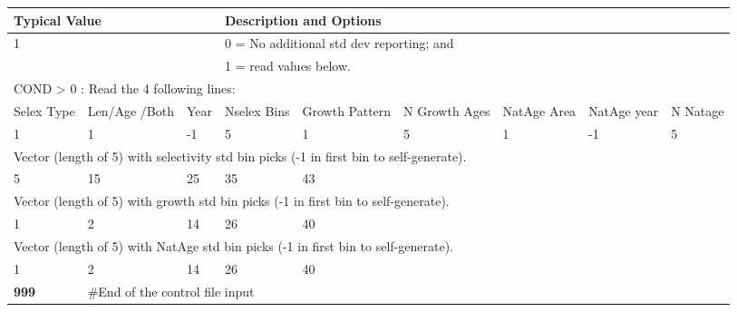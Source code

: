 \begin{longtable}{p{1.1cm} p{1.4cm} p{1.2cm} p{1.2cm} p{1.3cm} p{1.6cm} p{1.4cm} p{1.4cm} p{1.4cm}}

	\hline
	\multicolumn{3}{l}{Typical Value} & \multicolumn{6}{l}{Description and Options}\Tstrut\Bstrut\\
	\hline
	\endfirsthead


	\multicolumn{3}{l}{1} & \multicolumn{6}{l}{0 = No additional std dev reporting; and} \Tstrut\\
	\multicolumn{3}{l}{ } & \multicolumn{6}{l}{1 = read values below.}\Bstrut\\

	\multicolumn{9}{l}{COND > 0 : Read the 4 following lines:}\Bstrut\\
	
	\hline
	\Tstrut Selex Type & Len/Age /Both & Year & Nselex Bins & Growth Pattern & N Growth Ages & NatAge Area & NatAge year  & N Natage\Bstrut\\
	\hline
	1 & 1 & -1 & 5 & 1 & 5 & 1 & -1 & 5\Tstrut\Bstrut\\ 
	
	\hline
	\multicolumn{9}{l}{Vector (length of 5) with selectivity std bin picks (-1 in first bin to self-generate).} \Tstrut\Bstrut\\
	\hline
	5 & 15 & 25 & 35 & 43 & & & & \Tstrut\Bstrut\\
	
	\hline
	\multicolumn{9}{l}{Vector (length of 5) with growth std bin picks (-1 in first bin to self-generate).} \Tstrut\Bstrut\\
	\hline	
	1 & 2 & 14 & 26 & 40 & & & & \Tstrut\Bstrut\\	
	
	\hline
	\multicolumn{9}{l}{Vector (length of 5) with NatAge std bin picks (-1 in first bin to self-generate).} \Tstrut\Bstrut\\
	\hline	
	1 & 2 & 14 & 26 & 40 & & & & \Tstrut\Bstrut\\
	
	\hline
	\bfseries{999} & \multicolumn{8}{l}{\#End of the control file input}\Tstrut\Bstrut\\
	\hline			
\end{longtable}



